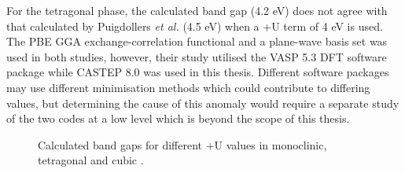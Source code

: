 For the tetragonal phase, the calculated band gap (4.2 eV) does not agree with that calculated by Puigdollers \emph{et al.} \cite{RuizPuigdollers2016} (4.5 eV) when a +U term of 4 eV is used. The PBE GGA exchange-correlation functional and a plane-wave basis set was used in both studies, however, their study utilised the VASP 5.3 DFT software package while CASTEP 8.0 was used in this thesis. Different software packages may use different minimisation methods which could contribute to differing values, but determining the cause of this anomaly would require a separate study of the two codes at a low level which is beyond the scope of this thesis.




\begin{figure}[ht] %
\begin{center}
		\caption{Calculated band gaps for different +U values in monoclinic, tetragonal and cubic \zirconia .}
		\label{Figure:plusubandgap}
	\end{center}
\end{figure}

